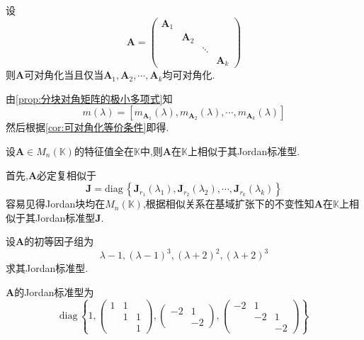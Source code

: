 \begin{green}
\begin{corollary}[代数意义的多个限制可对角化]\label{cor:代数意义的多个限制可对角化}
    设
    \[
    \bm{A}=\begin{pmatrix}
        \bm{A}_1&&&\\
        &\bm{A}_2&&\\
        &&\ddots&\\
        &&&\bm{A}_k
    \end{pmatrix}
    \]则$\bm{A}$可对角化当且仅当$\bm{A}_1,\bm{A}_2,\cdots,\bm{A}_k$均可对角化.
\end{corollary}
\begin{Proof}
    由\cref{prop:分块对角矩阵的极小多项式}知\[
    m\left(\lambda\right)=\left[
        m_{\bm{A}_1}\left(\lambda\right),m_{\bm{A}_2}\left(\lambda\right),\cdots,m_{\bm{A}_k}\left(\lambda\right)
    \right]
    \]然后根据\cref{cor:可对角化等价条件}即得.
\end{Proof}
\end{green}
\begin{green}
\begin{corollary}[较小的域]\label{cor:较小的域}
    设$\bm{A}\in M_n\left(\mathbb{K}\right)$的特征值全在$\mathbb{K}$中,则$\bm{A}$在$\mathbb{K}$上相似于其\textup{Jordan}标准型.
\end{corollary}
\begin{Proof}
    首先,$\bm{A}$必定复相似于\[
    \bm{J}= \mathrm{diag}\,\left\{
        \bm{J}_{r_1}\left(\lambda_1\right),\bm{J}_{r_2}\left(\lambda_2\right),\cdots,\bm{J}_{r_k}\left(\lambda_k\right)
    \right\}
    \]容易见得Jordan块均在$M_n\left(\mathbb{K}\right)$,根据相似关系在基域扩张下的不变性知$\bm{A}$在$\mathbb{K}$上相似于其Jordan标准型$\bm{J}$.
\end{Proof}
\end{green}
\begin{brown}
\begin{example}
    设$\bm{A}$的初等因子组为\[
    \lambda-1,\left(\lambda-1\right)^3,\left(\lambda+2\right)^2,\left(\lambda+2\right)^3\]求其\textup{Jordan}标准型.
\end{example}
\begin{solution}
    $\bm{A}$的\textup{Jordan}标准型为\[
    \mathrm{diag}\,\left\{
        1,\begin{pmatrix}
            1&1&\\
            &1&1\\
            &&1
        \end{pmatrix},\begin{pmatrix}
            -2&1\\
            &-2
        \end{pmatrix},
        \begin{pmatrix}
            -2&1&\\
            &-2&1\\
            &&-2
        \end{pmatrix}
    \right\}
    \]
\end{solution}
\end{brown}

